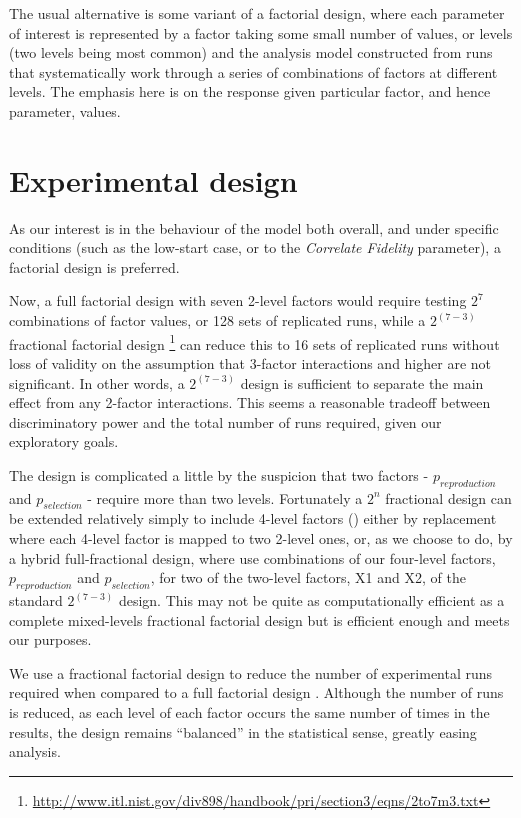 The usual alternative is some variant of a factorial design, where each parameter of interest is represented by a factor taking some small number of values, or levels (two levels being most common) and the analysis model constructed from runs that systematically work through a series of combinations of factors at different levels. The emphasis here is on the response given particular factor, and hence parameter, values.

\section{Experimental design}

As our interest is in the behaviour of the model both overall, and under specific conditions (such as the low-start case, or to the \emph{Correlate Fidelity} parameter), a factorial design is preferred.

Now, a full factorial design with seven 2-level factors would require testing $2^{7}$ combinations of factor values, or 128 sets of replicated runs, while a $2^{(7-3)}$ fractional factorial design \footnote{\eg  \url{http://www.itl.nist.gov/div898/handbook/pri/section3/eqns/2to7m3.txt}} can reduce this to 16 sets of replicated runs without loss of validity on the assumption that 3-factor interactions and higher are not significant. In other words, a $2^{(7-3)}$ design is sufficient to separate the main effect from any 2-factor interactions.  This seems a reasonable tradeoff between discriminatory power and the total number of runs required, given our exploratory goals.

The design is complicated a little by the suspicion that two factors - $p_{reproduction}$ and $p_{selection}$ - require more than two levels. Fortunately a $2^n$ fractional design can be extended relatively simply to include 4-level factors (\cite[368]{Montgomery2009}) either by replacement where each 4-level factor is mapped to two 2-level ones, or, as we choose to do, by a hybrid full-fractional design, where use combinations of our four-level factors,  $p_{reproduction}$ and $p_{selection}$, for two of the two-level factors, X1 and X2, of the standard $2^{(7-3)}$ design. This may not be quite as computationally efficient as a complete mixed-levels fractional factorial design but is efficient enough and meets our purposes.

We use a fractional factorial design to reduce the number of experimental runs required when compared to a full factorial design \autocite{Montgomery2009}. Although the number of runs is reduced, as each level of each factor occurs the same number of times in the results, the design remains ``balanced'' in the statistical sense, greatly easing analysis.

